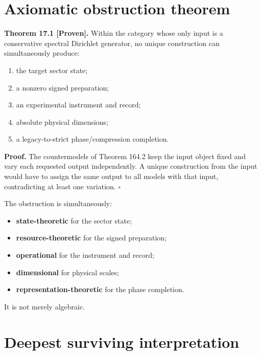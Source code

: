 \documentclass[11pt,a4paper,openany]{report}
\newcommand{\statusProven}{\textcolor{fingreen}{[Proven]}}
\begin{document}
\section{Axiomatic obstruction theorem}

\textbf{Theorem 17.1 \statusProven{}.} Within the category whose only input is a conservative spectral Dirichlet generator, no unique construction can simultaneously produce:

\begin{enumerate}
\item 
the target sector state;

\item 
a nonzero signed preparation;

\item 
an experimental instrument and record;

\item 
absolute physical dimensions;

\item 
a legacy-to-strict phase/\allowbreak{}compression completion.

\end{enumerate}

\textbf{Proof.} The countermodels of Theorem 164.2 keep the input object fixed and vary each requested output independently. A unique construction from the input would have to assign the same output to all models with that input, contradicting at least one variation. \(\square\)

The obstruction is simultaneously:

\begin{itemize}
\item 
\textbf{state-theoretic} for the sector state;

\item 
\textbf{resource-theoretic} for the signed preparation;

\item 
\textbf{operational} for the instrument and record;

\item 
\textbf{dimensional} for physical scales;

\item 
\textbf{representation-theoretic} for the phase completion.

\end{itemize}

It is not merely algebraic.

\section{Deepest surviving interpretation}
\end{document}
